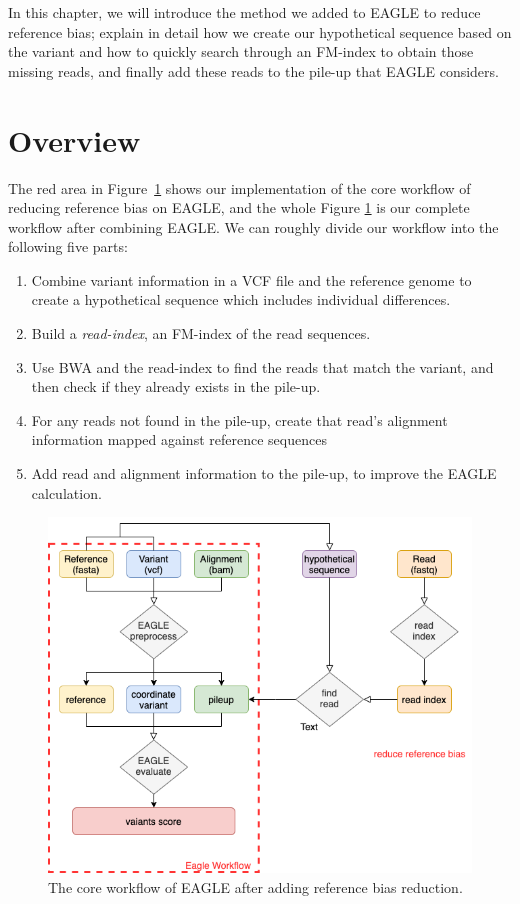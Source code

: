 \hspace{24pt}
In this chapter, we will introduce the method we added to EAGLE to reduce reference bias; explain in detail how we create our hypothetical sequence based on the variant and how to quickly search through an FM-index to obtain those missing reads, and finally add these reads to the pile-up that EAGLE considers.
\section{Overview}
The red area in Figure~\ref{core-workflow} shows our implementation of the core workflow of reducing reference bias on EAGLE, and the whole Figure \ref{core-workflow} is our complete workflow after combining EAGLE. 
We can roughly divide our workflow into the following five parts:

\begin{enumerate}
\item Combine variant information in a VCF file and the reference genome to create a hypothetical sequence which includes individual differences.
\item Build a \textit{read-index}, an FM-index of the read sequences.
\item Use BWA and the read-index to find the reads that match the variant, and then check if they already exists in the pile-up.
\item For any reads not found in the pile-up, create that read's alignment information mapped against reference sequences 
\item Add read and alignment information to the pile-up, to improve the EAGLE calculation.
\end{enumerate}

\begin{figure}[H]
\includegraphics[width=0.8\columnwidth]{body/image/core-workflow.png}
\caption[Core workflow]{The core workflow of EAGLE after adding reference bias reduction.}
\label{core-workflow}
\end{figure}


